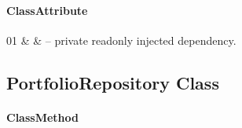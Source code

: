 \paragraph{ClassAttribute}
\begin{ClassAttributeTable}
01 &  &  -- private readonly injected dependency. \\ \hline
\end{ClassAttributeTable}

\subsection{PortfolioRepository Class}
\label{cls:nhuy-PortfolioRepository}

\paragraph{ClassMethod}
